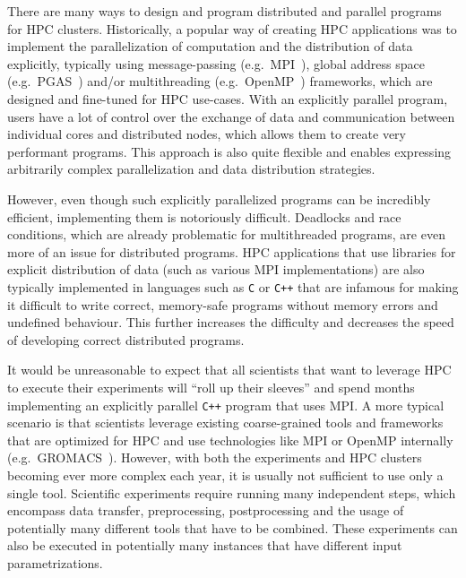 There are many ways to design and program distributed and parallel programs for HPC clusters.
Historically, a popular way of creating HPC applications was to implement the parallelization of
computation and the distribution of data explicitly, typically using message-passing (e.g.\
MPI~\cite{mpi}), global address space (e.g.\ PGAS~\cite{pgas}) and/or
multithreading (e.g.\ OpenMP~\cite{openmp}) frameworks, which are designed and fine-tuned
for HPC use-cases. With an explicitly parallel program, users have a lot of control over the
exchange of data and communication between individual cores and distributed nodes, which allows
them to create very performant programs. This approach is also quite flexible and enables
expressing arbitrarily complex parallelization and data distribution strategies.

However, even though such explicitly parallelized programs can be incredibly efficient,
implementing them is notoriously difficult. Deadlocks and race conditions, which are already
problematic for multithreaded programs, are even more of an issue for distributed programs. HPC
applications that use libraries for explicit distribution of data (such as various MPI
implementations) are also typically implemented in languages such as \texttt{C} or
\texttt{C++} that are infamous for making it difficult to write correct, memory-safe
programs without memory errors and undefined behaviour. This further increases the difficulty and
decreases the speed of developing correct distributed programs.

It would be unreasonable to expect that all scientists that want to leverage HPC to execute their
experiments will ``roll up their sleeves'' and spend months implementing an explicitly parallel
\texttt{C++} program that uses MPI. A more typical scenario is that scientists leverage
existing coarse-grained tools and frameworks that are optimized for HPC and use technologies like
MPI or OpenMP internally (e.g.\ GROMACS~\cite{gromacs}). However, with both the experiments
and HPC clusters becoming ever more complex each year, it is usually not sufficient to use only a
single tool. Scientific experiments require running many independent steps, which encompass data
transfer, preprocessing, postprocessing and the usage of potentially many different tools that have
to be combined. These experiments can also be executed in potentially many instances that have
different input parametrizations.

